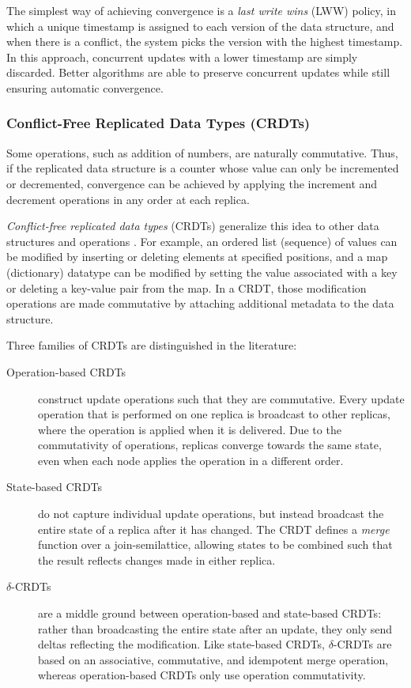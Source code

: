 The simplest way of achieving convergence is a \emph{last write wins} (LWW) policy, in which a
unique timestamp is assigned to each version of the data structure, and when there is a conflict,
the system picks the version with the highest timestamp. In this approach, concurrent updates with a
lower timestamp are simply discarded. Better algorithms are able to preserve concurrent updates
while still ensuring automatic convergence.

\subsubsection{Conflict-Free Replicated Data Types (CRDTs)}

Some operations, such as addition of numbers, are naturally commutative. Thus, if the replicated
data structure is a counter whose value can only be incremented or decremented, convergence can be
achieved by applying the increment and decrement operations in any order at each replica.

\emph{Conflict-free replicated data types} (CRDTs) generalize this idea to other data structures and
operations
\cite{Shapiro:2011wy,Shapiro:2011un,Roh:2011dw,Preguica:2009fz,Oster:2006wj,Weiss:2010hx,Nedelec:2013ky,Kleppmann:2016ve}.
For example, an ordered list (sequence) of values can be modified by inserting or deleting elements
at specified positions, and a map (dictionary) datatype can be modified by setting the value
associated with a key or deleting a key-value pair from the map. In a CRDT, those modification
operations are made commutative by attaching additional metadata to the data structure.

Three families of CRDTs are distinguished in the literature:
\begin{description}
\item[Operation-based CRDTs] construct update operations such that they are commutative. Every
update operation that is performed on one replica is broadcast to other replicas, where the
operation is applied when it is delivered. Due to the commutativity of operations, replicas converge
towards the same state, even when each node applies the operation in a different order.
\item[State-based CRDTs] do not capture individual update operations, but instead broadcast the
entire state of a replica after it has changed. The CRDT defines a \emph{merge} function over a
join-semilattice, allowing states to be combined such that the result reflects changes made in
either replica.
\item[$\delta$-CRDTs] \cite{Almeida:2015fc} are a middle ground between operation-based and state-based
CRDTs: rather than broadcasting the entire state after an update, they only send deltas reflecting
the modification. Like state-based CRDTs, $\delta$-CRDTs are based on an associative, commutative,
and idempotent merge operation, whereas operation-based CRDTs only use operation commutativity.
\end{description}

